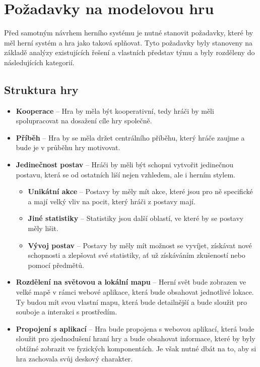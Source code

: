 \chapter{Požadavky na modelovou hru}
\label{chap:requirements}

Před samotným návrhem herního systému je nutné stanovit požadavky, které by měl herní systém a hra jako taková splňovat. Tyto požadavky byly stanoveny na základě analýzy existujících řešení  a vlastních představ týmu a byly rozděleny do následujících kategorií.

\section{Struktura hry}
\label{sec:req_structure}

\begin{itemize}
    \item \textbf{Kooperace} -- 
        Hra by měla být kooperativní, tedy hráči by měli spolupracovat na dosažení cíle hry společně.
    \item \textbf{Příběh} -- 
        Hra by se měla držet centrálního příběhu, který hráče zaujme a bude je v průběhu hry motivovat.
    \item \textbf{Jedinečnost postav} -- 
        Hráči by měli být schopni vytvořit jedinečnou postavu, která se od ostatních liší nejen vzhledem, ale i herním stylem.

    \begin{itemize}
        \item \textbf{Unikátní akce} -- 
            Postavy by měly mít akce, které jsou pro ně specifické a mají velký vliv na pocit, který hráči z postavy mají.
        \item \textbf{Jiné statistiky} -- 
            Statistiky jsou další oblastí, ve které by se postavy měly lišit.
        \item \textbf{Vývoj postav} -- 
            Postavy by měly mít možnost se vyvíjet, získávat nové schopnosti a zlepšovat své statistiky, ať už získáváním zkušeností nebo pomocí předmětů.
    \end{itemize}

    \item \textbf{Rozdělení na světovou a lokální mapu} -- 
        Herní svět bude zobrazen ve velké mapě v rámci webové aplikace, která bude obsahovat jednotlivé lokace. Ty budou mít svou vlastní mapu, která bude detailnější a bude sloužit pro souboje a interakci s prostředím.
    \item \textbf{Propojení s aplikací} -- 
        Hra bude propojena s webovou aplikací, která bude sloužit pro zjednodušení hraní hry a bude obsahovat informace, které by byly obtížné zobrazit ve fyzických komponentách. Je však nutné dbát na to, aby si hra zachovala svůj deskový charakter.
\end{itemize}


